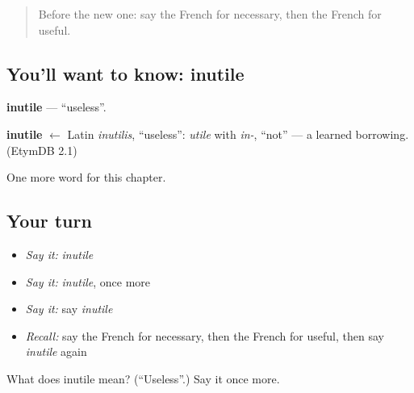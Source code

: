 \label{lesson:FR-C191-inutile}



\begin{quote}
Before the new one: say the French for necessary, then the French for useful.
\end{quote}

\subsection*{You'll want to know: inutile}
\textbf{inutile} — \textquotedblleft{}useless\textquotedblright{}.

\begin{cousinweb}
\textbf{inutile} $\leftarrow$ Latin \emph{inutilis}, \textquotedblleft{}useless\textquotedblright{}: \emph{utile} with \emph{in-}, \textquotedblleft{}not\textquotedblright{} — a learned borrowing. (EtymDB 2.1)
\end{cousinweb}

\begin{grammarlens}[title={What you've built}]
One more word for this chapter.
\end{grammarlens}

\subsection*{Your turn}
\begin{itemize}
\raggedright
  \item \emph{Say it:} \emph{inutile}
  \item \emph{Say it:} \emph{inutile}, once more
  \item \emph{Say it:} say \emph{inutile}
  \item \emph{Recall:} say the French for necessary, then the French for useful, then say \emph{inutile} again
\end{itemize}

\begin{tcolorbox}[breakable,colback=teal!4,colframe=teal!35!black,title={Before you move on}]
What does inutile mean? (\textquotedblleft{}Useless\textquotedblright{}.) Say it once more.
\end{tcolorbox}
